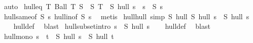 \begin{isabellebody}
\ auto%
\endisatagproof
{\isafoldproof}%
%
\isadelimproof
\isanewline
%
\endisadelimproof
\isanewline
{}\isamarkupfalse%
\ hull{\isacharunderscore}{\kern0pt}eq{\isacharcolon}{\kern0pt}\ {\isachardoublequoteopen}{\isacharparenleft}{\kern0pt}{\isasymAnd}T{\isachardot}{\kern0pt}\ Ball\ T\ S\ {\isasymLongrightarrow}\ S\ {\isacharparenleft}{\kern0pt}{\isasymInter}T{\isacharparenright}{\kern0pt}{\isacharparenright}{\kern0pt}\ {\isasymLongrightarrow}\ {\isacharparenleft}{\kern0pt}S\ hull\ s{\isacharparenright}{\kern0pt}\ {\isacharequal}{\kern0pt}\ s\ {\isasymlongleftrightarrow}\ S\ s{\isachardoublequoteclose}\isanewline
%
\isadelimproof
\ \ %
\endisadelimproof
%
\isatagproof
{}\isamarkupfalse%
\ hull{\isacharunderscore}{\kern0pt}same{\isacharbrackleft}{\kern0pt}of\ S\ s{\isacharbrackright}{\kern0pt}\ hull{\isacharunderscore}{\kern0pt}in{\isacharbrackleft}{\kern0pt}of\ S\ s{\isacharbrackright}{\kern0pt}\ \isamarkupfalse%
\ metis%
\endisatagproof
{\isafoldproof}%
%
\isadelimproof
\isanewline
%
\endisadelimproof
\isanewline
{}\isamarkupfalse%
\ hull{\isacharunderscore}{\kern0pt}hull\ {\isacharbrackleft}{\kern0pt}simp{\isacharbrackright}{\kern0pt}{\isacharcolon}{\kern0pt}\ {\isachardoublequoteopen}S\ hull\ {\isacharparenleft}{\kern0pt}S\ hull\ s{\isacharparenright}{\kern0pt}\ {\isacharequal}{\kern0pt}\ S\ hull\ s{\isachardoublequoteclose}\isanewline
%
\isadelimproof
\ \ %
\endisadelimproof
%
\isatagproof
{}\isamarkupfalse%
\ hull{\isacharunderscore}{\kern0pt}def\ \isamarkupfalse%
\ blast%
\endisatagproof
{\isafoldproof}%
%
\isadelimproof
\isanewline
%
\endisadelimproof
\isanewline
{}\isamarkupfalse%
\ hull{\isacharunderscore}{\kern0pt}subset{\isacharbrackleft}{\kern0pt}intro{\isacharbrackright}{\kern0pt}{\isacharcolon}{\kern0pt}\ {\isachardoublequoteopen}s\ {\isasymsubseteq}\ {\isacharparenleft}{\kern0pt}S\ hull\ s{\isacharparenright}{\kern0pt}{\isachardoublequoteclose}\isanewline
%
\isadelimproof
\ \ %
\endisadelimproof
%
\isatagproof
{}\isamarkupfalse%
\ hull{\isacharunderscore}{\kern0pt}def\ \isamarkupfalse%
\ blast%
\endisatagproof
{\isafoldproof}%
%
\isadelimproof
\isanewline
%
\endisadelimproof
\isanewline
{}\isamarkupfalse%
\ hull{\isacharunderscore}{\kern0pt}mono{\isacharcolon}{\kern0pt}\ {\isachardoublequoteopen}s\ {\isasymsubseteq}\ t\ {\isasymLongrightarrow}\ {\isacharparenleft}{\kern0pt}S\ hull\ s{\isacharparenright}{\kern0pt}\ {\isasymsubseteq}\ {\isacharparenleft}{\kern0pt}S\ hull\ t{\isacharparenright}{\kern0pt}{\isachardoublequoteclose}\isanewline

\end{isabellebody}
